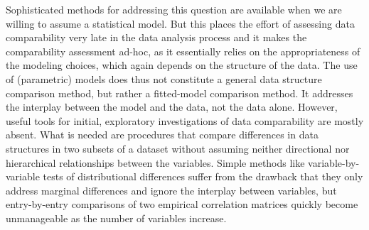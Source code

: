 \documentclass[]{interact}
\theoremstyle{plain}%
\theoremstyle{definition}
\theoremstyle{remark}
\begin{document}
Sophisticated methods for addressing this question are available when we are willing to assume a statistical model. But this places the effort of assessing data comparability very late in the data analysis process and it makes the comparability assessment ad-hoc, as it essentially relies on the appropriateness of the modeling choices, which again depends on the structure of the data. The use of (parametric) models does thus not constitute a general data structure comparison method, but rather a fitted-model comparison method. It addresses the interplay between the model and the data, not the data alone. However, useful tools for initial, exploratory investigations of data comparability %
are mostly absent. What is needed are procedures that compare differences in data structures in two subsets of a dataset without assuming neither directional nor hierarchical relationships between the variables.  Simple methods like variable-by-variable tests of distributional differences suffer from the drawback that they only address marginal differences and ignore the interplay between variables, but entry-by-entry comparisons of two empirical correlation matrices quickly become unmanageable as the number of variables increase.

\end{document}
